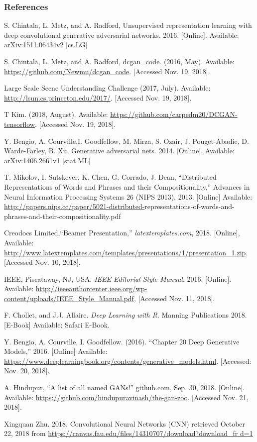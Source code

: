 \documentclass{beamer}
\begin{document}
\begin{frame}[allowframebreaks]
\frametitle{References}
\footnotesize{
\begin{thebibliography}{99} %

 S. Chintala, L. Metz, and A. Radford, 
Unsupervised representation learning with deep convolutional generative 
adversarial networks.  2016. [Online]. Available: arXiv:1511.06434v2 [cs.LG]

 S. Chintala, L. Metz, and A. Radford, dcgan\_code. (2016,
May).  Available: \url{https://github.com/Newmu/dcgan\_code}. [Accessed Nov. 19,
2018].

 Large Scale Scene Understanding Challenge (2017, July).
Available: \url{http://lsun.cs.princeton.edu/2017/}. [Accessed Nov. 19, 2018].

 T Kim. (2018, August).  Available: \url{https://github.com/carpedm20/DCGAN-tensorflow}. [Accessed Nov. 19, 2018].


 Y. Bengio, A. Courville,I. Goodfellow, M. Mirza, S. Ozair,  
J. Pouget-Abadie,  D. Warde-Farley, B. Xu, Generative adversarial nets. 2014. 
[Online]. Available: arXiv:1406.2661v1 [stat.ML]

 T. Mikolov, I. Sutskever, K. Chen, G. Corrado, J. Dean,
``Distributed Representations of Words and Phrases and their Compositionality,''
Advances in Neural Information Processing Systems 26 (NIPS 2013), 2013. 
[Online] Available: \url{http://papers.nips.cc/paper/5021-distributed-}representations-of-words-and-phrases-and-their-compositionality.pdf

 Creodocs Limited,``Beamer Presentation,''
\emph{latextemplates.com}, 2018. [Online], Available: 
\url{http://www.latextemplates.com/templates/presentations/1/presentation\_1.zip}. [Accessed Nov. 10, 2018].

 IEEE, Piscataway, NJ, USA. \emph{IEEE Editorial Style Manual}. 2016.
[Online]. Available: \url{http://ieeeauthorcenter.ieee.org/wp-content/uploads/IEEE\_Style_Manual.pdf}, [Accessed Nov. 11, 2018].

 F. Chollet, and J.J. Allaire.  
\textit{Deep Learning with R}. Manning Publications 2018. [E-Book] Available: Safari
E-Book.

 Y. Bengio, A. Courville, I. Goodfellow. (2016).
``Chapter 20 Deep Generative Models,'' 2016. [Online] Available:
\url{https://www.deeplearningbook.org/contents/generative\_models.html}.
[Accessed: Nov. 20, 2018].

 A. Hindupur, ``A list of all named GANs!'' github.com, Sep. 30,
2018. [Online]. Available: \url{https://github.com/hindupuravinash/the-gan-zoo}. 
[Accessed Nov. 21, 2018]. 

 Xingquan Zhu. 2018. Convolutional Neural Networks (CNN) retrieved
 October 22, 2018 from \url{https://canvas.fau.edu/files/14310707/download?download\_fr
d=1}

\end{thebibliography}
}
\end{frame}
\end{document}

